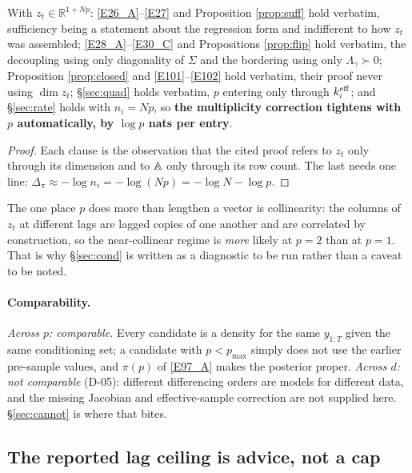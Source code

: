 \begin{proposition}[the $p=1$ results generalise by substitution]\label{prop:subst}
With $z_t\in\mathbb{R}^{1+Np}$: \eqref{E26_A}--\eqref{E27} and Proposition
\ref{prop:suff} hold verbatim, sufficiency being a statement about the regression
form and indifferent to how $z_t$ was assembled; \eqref{E28_A}--\eqref{E30_C} and
Propositions \ref{prop:flip} hold verbatim, the decoupling using only diagonality of
$\Sigma$ and the bordering using only $\Lambda_\gamma\succ0$; Proposition
\ref{prop:closed} and \eqref{E101}--\eqref{E102} hold verbatim, their proof never
using $\dim z_t$; \S\ref{sec:quad} holds verbatim, $p$ entering only through
$k_i^{\mathrm{eff}}$; and \S\ref{sec:rate} holds with $n_i=Np$, so \textbf{the multiplicity
correction tightens with $p$ automatically, by $\log p$ nats per entry}.
\end{proposition}

\begin{proof}
Each clause is the observation that the cited proof refers to $z_t$ only through its
dimension and to $\mathbb{A}$ only through its row count. The last needs one line:
$\Delta_\pi\approx-\log n_i=-\log(Np)=-\log N-\log p$.
\end{proof}

The one place $p$ does more than lengthen a vector is collinearity: the columns of
$z_t$ at different lags are lagged copies of one another and are correlated by
construction, so the near-collinear regime is \emph{more} likely at $p=2$ than at
$p=1$. That is why \S\ref{sec:cond} is written as a diagnostic to be run rather than a
caveat to be noted.

\paragraph{Comparability.} \emph{Across $p$: comparable.} Every candidate is a
density for the same $y_{1:T}$ given the same conditioning set; a candidate with
$p<p_{\max}$ simply does not use the earlier pre-sample values, and $\pi(p)$ of
\eqref{E97_A} makes the posterior proper. \emph{Across $d$: not comparable} (D-05):
different differencing orders are models for different data, and the missing
Jacobian and effective-sample correction are not supplied here. \S\ref{sec:cannot}
is where that bites.

\subsection[The lag ceiling is advice]{The reported lag ceiling is advice, not a cap}\label{sec:ceiling}

